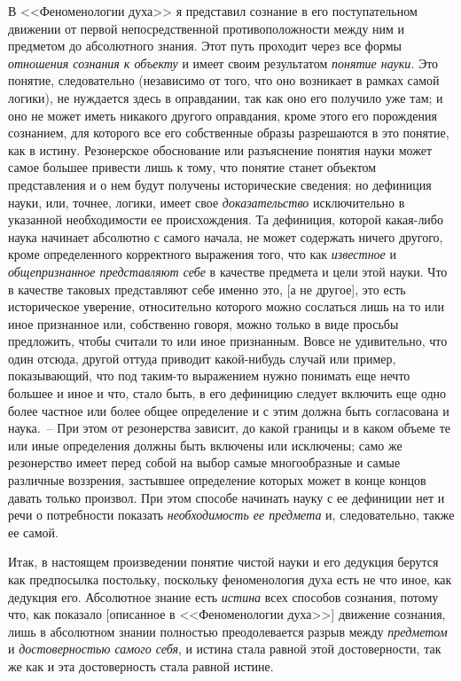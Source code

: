 В <<Феноменологии духа>> я представил сознание в
его поступательном движении от первой непосредственной
противоположности между ним и предметом до
абсолютного знания. Этот путь проходит через все формы
\emph{отношения сознания к объекту} и имеет своим
результатом \emph{понятие науки}. Это понятие, следовательно
(независимо от того, что оно возникает в рамках самой
логики), не нуждается здесь в оправдании, так как оно
его получило уже там; и оно не может иметь никакого
другого оправдания, кроме этого его порождения сознанием,
для которого все его собственные образы разрешаются
в это понятие, как в истину. Резонерское обоснование
или разъяснение понятия науки может самое большее
привести лишь к тому, что понятие станет объектом
представления и о нем будут получены исторические
сведения; но дефиниция науки, или, точнее, логики,
имеет свое \emph{доказательство} исключительно в указанной
необходимости ее происхождения. Та дефиниция, которой
какая-либо наука начинает абсолютно с самого начала,
не может содержать ничего другого, кроме определенного
корректного выражения того, что как \emph{известное}
и \emph{общепризнанное представляют себе} в качестве предмета
и цели этой науки. Что в качестве таковых представляют
себе именно это, [а не другое], это есть историческое
уверение, относительно которого можно сослаться
лишь на то или иное признанное или, собственно говоря,
можно только в виде просьбы предложить, чтобы считали
то или иное признанным. Вовсе не удивительно, что
один отсюда, другой оттуда приводит какой-нибудь случай
или пример, показывающий, что под таким-то выражением
нужно понимать еще нечто большее и иное и
что, стало быть, в его дефиницию следует включить еще
одно более частное или более общее определение и с
этим должна быть согласована и наука.~-- При этом от
резонерства зависит, до какой границы и в каком объеме
те или иные определения должны быть включены или
исключены; само же резонерство имеет перед собой на
выбор самые многообразные и самые различные воззрения,
застывшее определение которых может в конце
концов давать только произвол. При этом способе начинать
науку с ее дефиниции нет и речи о потребности
показать \emph{необходимость ее предмета} и, следовательно,
также ее самой.

Итак, в настоящем произведении понятие чистой науки
и его дедукция берутся как предпосылка постольку,
поскольку феноменология духа есть не что иное, как дедукция
его. Абсолютное знание есть \emph{истина} всех способов
сознания, потому что, как показало [описанное в <<Феноменологии
духа>>] движение сознания, лишь в абсолютном
знании полностью преодолевается разрыв между
\emph{предметом} и \emph{достоверностью самого себя}, и истина стала
равной этой достоверности, так же как и эта достоверность
стала равной истине.

